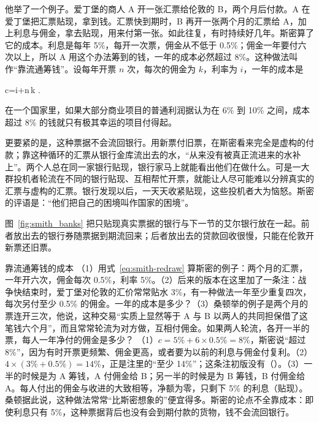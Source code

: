 他举了一个例子。爱丁堡的商人 A 开一张汇票给伦敦的 B，两个月后付款\cite{smith1776}。A 在爱丁堡把汇票贴现，拿到钱。汇票快到期时，B 再开一张两个月的汇票给 A，加上利息与佣金，拿去贴现，用来付第一张。如此往复，有时持续好几年。斯密算了它的成本。利息是每年 5\%，每开一次票，佣金从不低于 0.5\%；佣金一年要付六次以上，所以 A 用这个办法筹到的钱，一年的成本必然超过 8\%。这种做法叫作“靠流通筹钱”\cite{smith1776}。设每年开票 $n$ 次，每次的佣金为 $k$，利率为 $i$，一年的成本是
\begin{keyeq}
c=i+n\,k .\label{eq:smith-redraw}
\end{keyeq}
在一个国家里，如果大部分商业项目的普通利润据认为在 6\% 到 10\% 之间，成本超过 8\% 的钱就只有极其幸运的项目付得起\cite{smith1776}。

更要紧的是，这种票据不会流回银行。用新票付旧票，在斯密看来完全是虚构的付款；靠这种循环的汇票从银行金库流出去的水，“从来没有被真正流进来的水补上”\cite{smith1776}。两个人总在同一家银行贴现，银行家马上就能看出他们在做什么。可是一大群投机者轮流在不同的银行贴现、互相帮忙开票，就能让人尽可能难以分辨真实的汇票与虚构的汇票\cite{smith1776}。银行发现以后，一天天收紧贴现，这些投机者大为恼怒。斯密的评语是：“他们把自己的困境叫作国家的困境”\cite{smith1776}。

图~\ref{fig:smith_banks} 把只贴现真实票据的银行与下一节的艾尔银行放在一起。前者放出去的银行券随票据到期流回来；后者放出去的贷款回收很慢，只能在伦敦开新票还旧票。

\begin{example}{靠流通筹钱的成本}\label{ex:smith-redraw}
（1）用式~\eqref{eq:smith-redraw} 算斯密的例子：两个月的汇票，一年开六次，佣金每次 0.5\%，利率 5\%。（2）后来的版本在这里加了一条注：战争快结束时，爱丁堡对伦敦的汇价常常贴水 3\%，有一种做法一年至少重复四次，每次另付至少 0.5\% 的佣金\cite{smith1776}。一年的成本是多少？（3）桑顿举的例子是两个月的票连开三次，他说，这种交易“实质上显然等于 A 与 B 以两人的共同担保借了这笔钱六个月”，而且常常轮流为对方做，互相付佣金\cite{thornton1802}。如果两人轮流，各开一半的票，每人一年净付的佣金是多少？
\solution （1）$c=5\%+6\times0.5\%=8\%$，斯密说“超过 8\%”，因为有时开票更频繁、佣金更高，或者要为以前的利息与佣金付复利。（2）$4\times(3\%+0.5\%)=14\%$，正是注里的“至少 14\%”；这条注初版没有（）。（3）一半的时候是为 A 筹钱，A 付佣金给 B；另一半的时候是为 B 筹钱，B 付佣金给 A。每人付出的佣金与收进的大致相等，净额为零，只剩下 5\% 的利息（贴现）。桑顿据此说，这种做法常常“比斯密想象的”便宜得多\cite{thornton1802}。斯密的论点不全靠成本：即使利息只有 5\%，这种票据背后也没有会到期付款的货物，钱不会流回银行。
\end{example}

